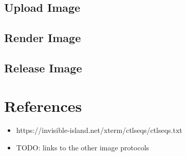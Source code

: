 \documentclass{article}
\begin{document}
\subsection{Upload Image}

\subsection{Render Image}

\subsection{Release Image}

\section{References}

\begin{itemize}
    \item https://invisible-island.net/xterm/ctlseqs/ctlseqs.txt
    \item TODO: links to the other image protocols
\end{itemize}
\end{document}
